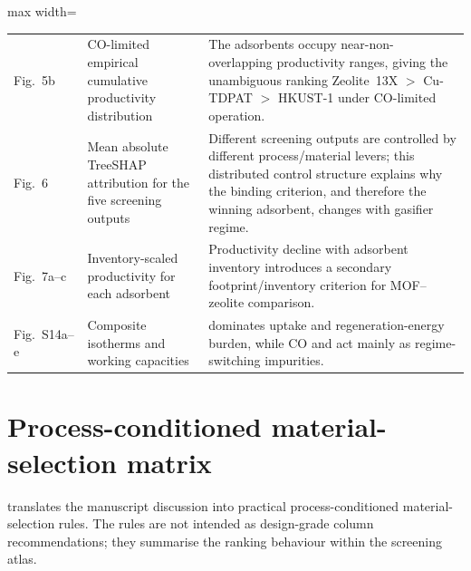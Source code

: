 \documentclass[11pt,a4paper]{article}
\newcommand{\COtwo}{\ce{CO2}}
\newcommand{\CHfour}{\ce{CH4}}
\begin{document}
\begin{table}[htbp]
\begin{adjustbox}{max width=\textwidth}
\begin{tabular}{p{}p{}p{}}
Fig.~5b &
CO-limited empirical cumulative productivity distribution &
The adsorbents occupy near-non-overlapping productivity ranges, giving
the unambiguous ranking Zeolite~13X $>$ Cu-TDPAT $>$ HKUST-1 under
CO-limited operation. \\

Fig.~6 &
Mean absolute TreeSHAP attribution for the five screening outputs &
Different screening outputs are controlled by different process/material
levers; this distributed control structure explains why the binding
criterion, and therefore the winning adsorbent, changes with gasifier
regime. \\

Fig.~7a--c &
Inventory-scaled productivity for each adsorbent &
Productivity decline with adsorbent inventory introduces a secondary
footprint/inventory criterion for MOF--zeolite comparison. \\

Fig.~S14a--e &
Composite isotherms and working capacities &
\COtwo{} dominates uptake and regeneration-energy burden, while CO and
\CHfour{} act mainly as regime-switching impurities. \\
\bottomrule
\end{tabular}
\end{adjustbox}
\end{table}

\FloatBarrier
\section{Process-conditioned material-selection matrix}

 translates the manuscript discussion into practical
process-conditioned material-selection rules. The rules are not intended
as design-grade column recommendations; they summarise the ranking
behaviour within the screening atlas.
\end{document}
